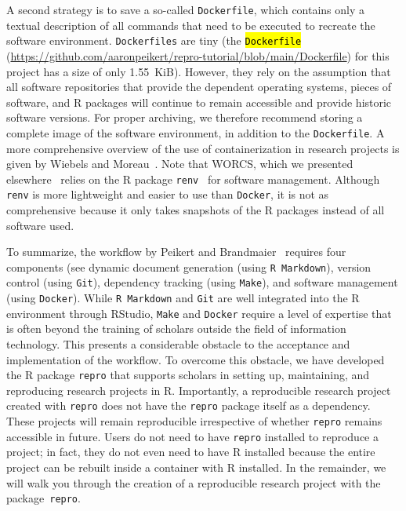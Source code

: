 \documentclass[psych,tutorial,accept,moreauthors,pdftex]{Definitions/mdpi}
\begin{document}
A second strategy is to save a so-called \texttt{Dockerfile}, which
contains only a textual description of all commands that need to be
executed to recreate the software environment. \texttt{Dockerfiles} are
tiny (the \hl{\texttt{Dockerfile}}
 (\url{https://github.com/aaronpeikert/repro-tutorial/blob/main/Dockerfile})
for this project has a size of only 1.55~KiB). However, they rely on the
assumption that all software repositories that provide the dependent
operating systems, pieces of software, and R packages will continue to
remain accessible and provide historic software versions. For proper
archiving, we therefore recommend storing a complete image of the
software environment, in addition to the \texttt{Dockerfile}. A more
comprehensive overview of the use of containerization in research
projects is given by Wiebels and Moreau~\citep{wiebelsLeveragingContainersReproducible2021}. Note that WORCS,
which we presented elsewhere~\citep{vanlissa2020worcs} relies on the R
package \texttt{renv}~\citep{R-renv} for software management. Although
\texttt{renv} is more lightweight and easier to use than \texttt{Docker}, it is not as comprehensive because it only
takes snapshots of the R packages instead of all software used.

To summarize, the workflow by Peikert and Brandmaier~\citep{Peikert2019} requires four
components (see 
 dynamic document generation (using
\texttt{R\ Markdown}), version control (using \texttt{Git}), dependency
tracking (using \texttt{Make}), and software management (using
\texttt{Docker}). While \texttt{R\ Markdown} and \texttt{Git} are well
integrated into the R environment through RStudio, \texttt{Make} and
\texttt{Docker} require a level of expertise that is often beyond the
training of scholars outside the field of information technology. This
presents a considerable obstacle to the acceptance and implementation of
the workflow. To overcome this obstacle, we have developed the R package
\texttt{repro} that supports scholars in setting up, maintaining, and
reproducing research projects in R. Importantly, a reproducible research
project created with \texttt{repro} does not have the \texttt{repro}
package itself as a dependency. These projects will remain reproducible
irrespective of whether \texttt{repro} remains accessible in future.
Users do not need to have \texttt{repro} installed to reproduce a
project; in fact, they do not even need to have R installed because the
entire project can be rebuilt inside a container with R installed. In
the remainder, we will walk you through the creation of a reproducible
research project with the package~\texttt{repro}.
\end{document}
